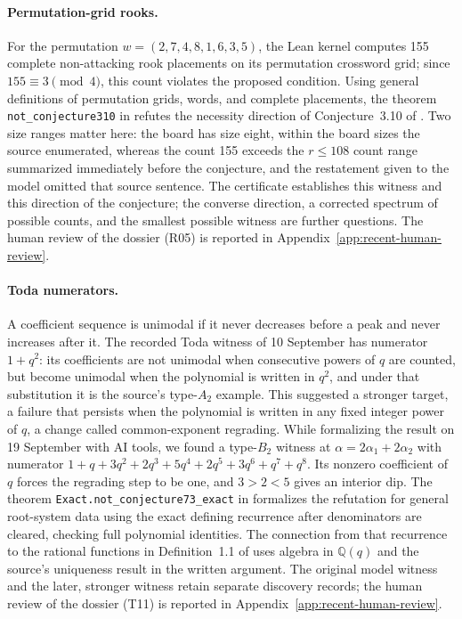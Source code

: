 \paragraph{Permutation-grid rooks.}
For the permutation $w=(2,7,4,8,1,6,3,5)$, the Lean kernel computes 155 complete non-attacking rook placements on its permutation crossword grid; since $155\equiv3\pmod4$, this count violates the proposed condition. Using general definitions of permutation grids, words, and complete placements, the theorem \texttt{not\_conjecture310} in  refutes the necessity direction of Conjecture~3.10 of \citet{lewiswon2026permutationgrids}. Two size ranges matter here: the board has size eight, within the board sizes the source enumerated, whereas the count 155 exceeds the $r\le108$ count range summarized immediately before the conjecture, and the restatement given to the model omitted that source sentence. The certificate establishes this witness and this direction of the conjecture; the converse direction, a corrected spectrum of possible counts, and the smallest possible witness are further questions. The human review of the dossier (R05) is reported in Appendix~\ref{app:recent-human-review}.

\paragraph{Toda numerators.}
A coefficient sequence is unimodal if it never decreases before a peak and never increases after it. The recorded Toda witness of 10 September has numerator $1+q^2$: its coefficients are not unimodal when consecutive powers of $q$ are counted, but become unimodal when the polynomial is written in $q^2$, and under that substitution it is the source's type-$A_2$ example. This suggested a stronger target, a failure that persists when the polynomial is written in any fixed integer power of $q$, a change called common-exponent regrading. While formalizing the result on 19 September with AI tools, we found a type-$B_2$ witness at $\alpha=2\alpha_1+2\alpha_2$ with numerator $1+q+3q^2+2q^3+5q^4+2q^5+3q^6+q^7+q^8$. Its nonzero coefficient of $q$ forces the regrading step to be one, and $3>2<5$ gives an interior dip. The theorem \texttt{Exact.not\_conjecture73\_exact} in  formalizes the refutation for general root-system data using the exact defining recurrence after denominators are cleared, checking full polynomial identities. The connection from that recurrence to the rational functions in Definition~1.1 of \citet{labelle2026toda} uses algebra in $\mathbb Q(q)$ and the source's uniqueness result in the written argument. The original model witness and the later, stronger witness retain separate discovery records; the human review of the dossier (T11) is reported in Appendix~\ref{app:recent-human-review}.


